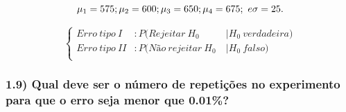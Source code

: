 \documentclass[
  a4paper]{article}
\begin{document}
\[\mu_1 = 575;\\ \mu_2 = 600;\\ \mu_3 = 650;\\ \mu_4 = 675;  \ e \\ \sigma = 25.\]

\[\begin{cases}
Erro \ tipo \ I  &: P(Rejeitar \ H_0         &| H_0 \ verdadeira)\\
Erro \ tipo \ II &: P(Não \ rejeitar \ H_0 \ &| H_0 \ falso)\\
\end{cases}\]

\hypertarget{qual-deve-ser-o-nuxfamero-de-repetiuxe7uxf5es-no-experimento-para-que-o-erro-seja-menor-que-0.01}{%
\subsubsection{1.9) Qual deve ser o número de repetições no experimento
para que o erro seja menor que
0.01\%?}\label{qual-deve-ser-o-nuxfamero-de-repetiuxe7uxf5es-no-experimento-para-que-o-erro-seja-menor-que-0.01}}
\end{document}
